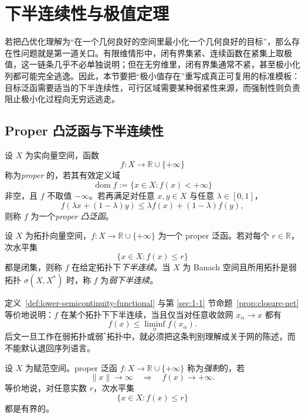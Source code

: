 \section{下半连续性与极值定理}

\label{sec:5-1}

若把凸优化理解为“在一个几何良好的空间里最小化一个几何良好的目标”，那么存在性问题就是第一道关口。有限维情形中，闭有界集紧、连续函数在紧集上取极值，这一链条几乎不必单独说明；但在无穷维里，闭有界集通常不紧，甚至极小化列都可能完全逃逸。因此，本节要把“极小值存在”重写成真正可复用的标准模板：目标泛函需要适当的下半连续性，可行区域需要某种弱紧性来源，而强制性则负责阻止极小化过程向无穷远逃走。

\subsection{Proper 凸泛函与下半连续性}

\begin{definition}\label{def:proper-functional}
设 $X$ 为实向量空间，函数
\[
f\colon X\to \mathbb R\cup\{+\infty\}
\]
称为\emph{proper} 的，若其有效定义域
\[
\operatorname{dom}f:=\{x\in X:f(x)<+\infty\}
\]
非空，且 $f$ 不取值 $-\infty$。若再满足对任意 $x,y\in X$ 与任意 $\lambda\in[0,1]$，
\[
f(\lambda x+(1-\lambda)y)\le \lambda f(x)+(1-\lambda)f(y),
\]
则称 $f$ 为一个\emph{proper 凸泛函}。
\end{definition}

\begin{definition}[下半连续与弱下半连续]\label{def:lower-semicontinuity-functional}
设 $X$ 为拓扑向量空间，$f\colon X\to \mathbb R\cup\{+\infty\}$ 为一个 proper 泛函。若对每个 $r\in\mathbb R$，次水平集
\[
\{x\in X:f(x)\le r\}
\]
都是闭集，则称 $f$ 在给定拓扑下\emph{下半连续}。当 $X$ 为 Banach 空间且所用拓扑是弱拓扑 $\sigma(X,X^\ast)$ 时，称 $f$ 为\emph{弱下半连续}。
\end{definition}

\begin{remark}
定义~\ref{def:lower-semicontinuity-functional} 与第 \ref{sec:1-1} 节命题~\ref{prop:closure-net} 等价地说明：$f$ 在某个拓扑下下半连续，当且仅当对任意收敛网 $x_\alpha\to x$ 都有
\[
f(x)\le \liminf_\alpha f(x_\alpha).
\]
后文一旦工作在弱拓扑或弱$^\ast$拓扑中，就必须把这条判别理解成关于网的陈述，而不能默认退回序列语言。
\end{remark}

\begin{definition}[强制性]\label{def:coercive-functional}
设 $X$ 为赋范空间。proper 泛函 $f\colon X\to \mathbb R\cup\{+\infty\}$ 称为\emph{强制}的，若
\[
\|x\|\to\infty \quad\Longrightarrow\quad f(x)\to+\infty.
\]
等价地说，对任意实数 $r$，次水平集
\[
\{x\in X:f(x)\le r\}
\]
都是有界的。
\end{definition}

